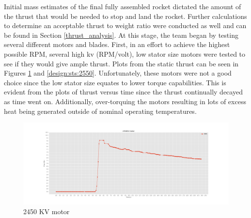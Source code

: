 Initial mass estimates of the final fully assembled rocket dictated the amount of the thrust that would be needed to stop and land the rocket. Further calculations to determine an acceptable thrust to weight ratio were conducted as well and can be found in Section \ref{thrust_analysis}. At this stage, the team began by testing several different motors and blades. First, in an effort to achieve the highest possible RPM, several high kv (RPM/volt), low stator size motors were tested to see if they would give ample thrust. Plots from the static thrust can be seen in Figures \ref{design:sts:2450} and \ref{design:sts:2550}. Unfortunately, these motors were not a good choice since the low stator size equates to lower torque capabilities. This is evident from the plots of thrust versus time since the thrust continually decayed as time went on. Additionally, over-torquing the motors resulting in lots of excess heat being generated outside of nominal operating temperatures.
\begin{figure}[H]
    \centering
    \includegraphics[width=\textwidth]{src/figs/small_2450_motor.png}
    \caption{2450 KV motor}
    \label{design:sts:2450}
\end{figure}


